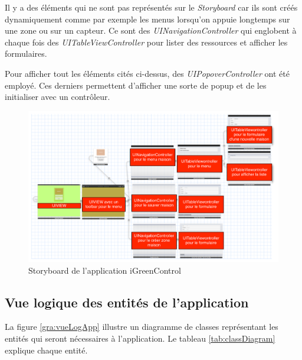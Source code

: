 \medskip

Il y a des éléments qui ne sont pas représentés sur le \emph{Storyboard} car ils sont créés dynamiquement comme par exemple les menus lorsqu'on appuie longtemps sur une zone ou sur un capteur. Ce sont des \emph{UINavigationController} qui englobent à chaque fois des \emph{UITableViewController} pour lister des ressources et afficher les formulaires.

\medskip

Pour afficher tout les éléments cités ci-dessus, des \emph{UIPopoverController} ont été employé. Ces derniers permettent d'afficher une sorte de popup et de les initialiser avec un contrôleur.

\begin{figure}[H]
      \centering
      \includegraphics[angle=0,width=13 cm]{00_media/04_storyboard.pdf}
      \caption{Storyboard de l'application iGreenControl}
      \label{gra:iGreencontrolStoryboard}
\end{figure}


\subsection{Vue logique des entités de l'application} %
\label{sub:vue_logique}

La figure \ref{gra:vueLogApp} illustre un diagramme de classes représentant les entités qui seront nécessaires à l'application. Le tableau \ref{tab:classDiagram} explique chaque entité.

